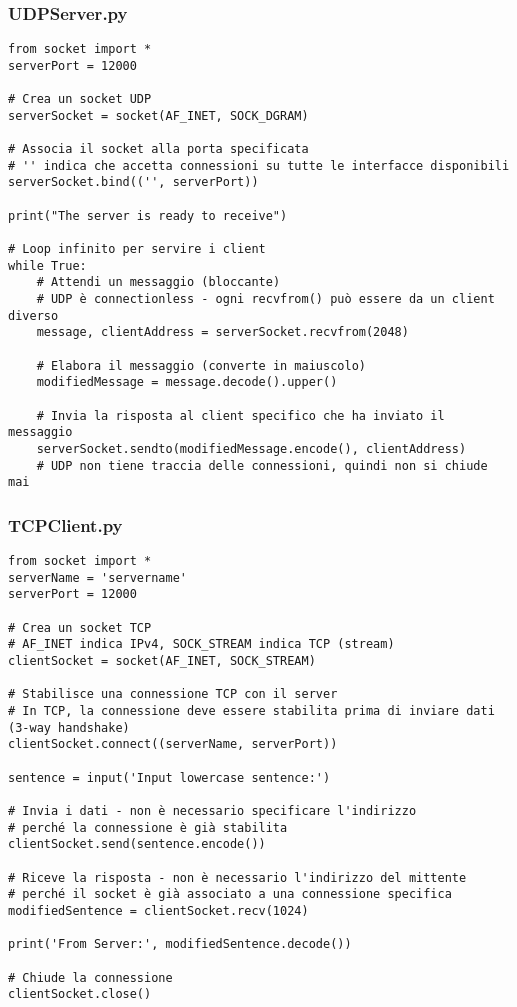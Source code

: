 \subsubsection{UDPServer.py}
\begin{verbatim}
from socket import *
serverPort = 12000

# Crea un socket UDP
serverSocket = socket(AF_INET, SOCK_DGRAM)

# Associa il socket alla porta specificata
# '' indica che accetta connessioni su tutte le interfacce disponibili
serverSocket.bind(('', serverPort))

print("The server is ready to receive")

# Loop infinito per servire i client
while True:
    # Attendi un messaggio (bloccante)
    # UDP è connectionless - ogni recvfrom() può essere da un client diverso
    message, clientAddress = serverSocket.recvfrom(2048)
    
    # Elabora il messaggio (converte in maiuscolo)
    modifiedMessage = message.decode().upper()
    
    # Invia la risposta al client specifico che ha inviato il messaggio
    serverSocket.sendto(modifiedMessage.encode(), clientAddress)
    # UDP non tiene traccia delle connessioni, quindi non si chiude mai
\end{verbatim}

\subsubsection{TCPClient.py}
\begin{verbatim}
from socket import *
serverName = 'servername'
serverPort = 12000

# Crea un socket TCP
# AF_INET indica IPv4, SOCK_STREAM indica TCP (stream)
clientSocket = socket(AF_INET, SOCK_STREAM)

# Stabilisce una connessione TCP con il server
# In TCP, la connessione deve essere stabilita prima di inviare dati (3-way handshake)
clientSocket.connect((serverName, serverPort))

sentence = input('Input lowercase sentence:')

# Invia i dati - non è necessario specificare l'indirizzo
# perché la connessione è già stabilita
clientSocket.send(sentence.encode())

# Riceve la risposta - non è necessario l'indirizzo del mittente
# perché il socket è già associato a una connessione specifica
modifiedSentence = clientSocket.recv(1024)

print('From Server:', modifiedSentence.decode())

# Chiude la connessione
clientSocket.close()
\end{verbatim}

